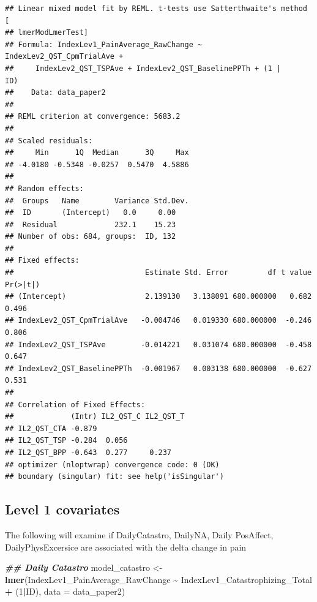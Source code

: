 \documentclass[
  12pt,
]{article}
\newenvironment{Shaded}{\begin{snugshade}}{\end{snugshade}}
\newcommand{\AttributeTok}[1]{\textcolor[rgb]{0.13,0.29,0.53}{#1}}
\newcommand{\DecValTok}[1]{\textcolor[rgb]{0.00,0.00,0.81}{#1}}
\newcommand{\DocumentationTok}[1]{\textcolor[rgb]{0.56,0.35,0.01}{\textbf{\textit{#1}}}}
\newcommand{\FunctionTok}[1]{\textcolor[rgb]{0.13,0.29,0.53}{\textbf{#1}}}
\newcommand{\NormalTok}[1]{#1}
\newcommand{\OtherTok}[1]{\textcolor[rgb]{0.56,0.35,0.01}{#1}}
\newcommand{\SpecialCharTok}[1]{\textcolor[rgb]{0.81,0.36,0.00}{\textbf{#1}}}
\begin{document}
\begin{verbatim}
## Linear mixed model fit by REML. t-tests use Satterthwaite's method [
## lmerModLmerTest]
## Formula: IndexLev1_PainAverage_RawChange ~ IndexLev2_QST_CpmTrialAve +  
##     IndexLev2_QST_TSPAve + IndexLev2_QST_BaselinePPTh + (1 |      ID)
##    Data: data_paper2
## 
## REML criterion at convergence: 5683.2
## 
## Scaled residuals: 
##     Min      1Q  Median      3Q     Max 
## -4.0180 -0.5348 -0.0257  0.5470  4.5886 
## 
## Random effects:
##  Groups   Name        Variance Std.Dev.
##  ID       (Intercept)   0.0     0.00   
##  Residual             232.1    15.23   
## Number of obs: 684, groups:  ID, 132
## 
## Fixed effects:
##                              Estimate Std. Error         df t value Pr(>|t|)
## (Intercept)                  2.139130   3.138091 680.000000   0.682    0.496
## IndexLev2_QST_CpmTrialAve   -0.004746   0.019330 680.000000  -0.246    0.806
## IndexLev2_QST_TSPAve        -0.014221   0.031074 680.000000  -0.458    0.647
## IndexLev2_QST_BaselinePPTh  -0.001967   0.003138 680.000000  -0.627    0.531
## 
## Correlation of Fixed Effects:
##             (Intr) IL2_QST_C IL2_QST_T
## IL2_QST_CTA -0.879                    
## IL2_QST_TSP -0.284  0.056             
## IL2_QST_BPP -0.643  0.277     0.237   
## optimizer (nloptwrap) convergence code: 0 (OK)
## boundary (singular) fit: see help('isSingular')
\end{verbatim}

\hypertarget{level-1-covariates}{%
\subsection{Level 1 covariates}\label{level-1-covariates}}

The following will examine if DailyCatastro, DailyNA, Daily PosAffect,
DailyPhysExcersice are associated with the delta change in pain

\begin{Shaded}
\begin{Highlighting}[]
\DocumentationTok{\#\# Daily Catastro}
\NormalTok{model\_catastro }\OtherTok{\textless{}{-}} \FunctionTok{lmer}\NormalTok{(IndexLev1\_PainAverage\_RawChange }\SpecialCharTok{\textasciitilde{}}\NormalTok{ IndexLev1\_Catastrophizing\_Total }\SpecialCharTok{+}\NormalTok{ (}\DecValTok{1}\SpecialCharTok{|}\NormalTok{ID), }\AttributeTok{data =}\NormalTok{ data\_paper2)}
\end{Highlighting}
\end{Shaded}
\end{document}
